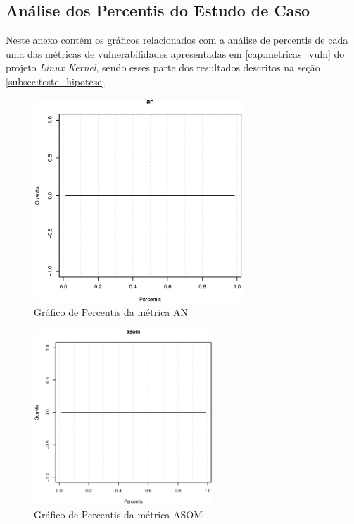 \begin{apendicesenv}

\partapendices

\chapter{Análise dos Percentis do Estudo de Caso} \label{anex:percentis}

Neste anexo contém os gráficos relacionados com a análise de percentis de cada
uma das métricas de vulnerabilidades apresentadas em \ref{cap:metricas_vuln}
do
projeto \emph{Linux Kernel}, sendo esses parte dos resultados descritos na seção
\ref{subsec:teste_hipotese}.


\begin{figure}[h]
  \centering
  \includegraphics[width=0.7\textwidth]
      {dados/linux/an.eps}
  \caption{Gráfico de Percentis da métrica AN}
\end{figure}

\newpage

\begin{figure}[h]
  \centering
  \includegraphics[width=0.6\textwidth]
      {dados/linux/asom.eps}
  \caption{Gráfico de Percentis da métrica ASOM}
  \label{graphic:asom}
\end{figure}


\end{apendicesenv}
